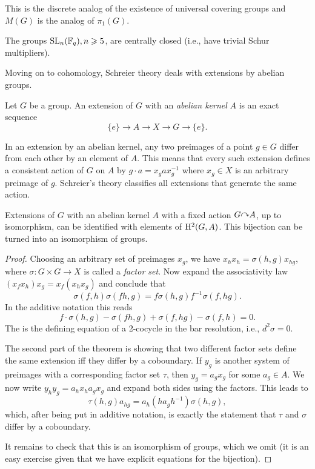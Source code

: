 This is the discrete analog of the existence of universal covering groups and $M(G)$ is the analog of $\pi_1(G)$.

\begin{thm}[Schur]
    The groups $\operatorname{SL}_n(\mathbb{F}_q),n\geqslant 5$, are centrally closed (i.e., have trivial Schur multipliers).
\end{thm}

Moving on to cohomology, Schreier theory deals with extensions by abelian groups.

\begin{defn}
    Let $G$ be a group. An extension of $G$ with an \emph{abelian kernel} $A$ is an exact sequence
    \[\{e\}\to A\to X\to G\to \{e\}.\]
\end{defn}

In an extension by an abelian kernel, any two preimages of a point $g\in G$ differ from each other by an element of $A$. This means that every such extension defines a consistent action of $G$ on $A$ by $g\cdot a=x_g ax_g^{-1}$ where $x_g\in X$ is an arbitrary preimage of $g$. Schreier's theory classifies all extensions that generate the same action.

\begin{thm}[Schreier]
    Extensions of $G$ with an abelian kernel $A$ with a fixed action $G\acts A$, up to isomorphism, can be identified with elements of $\mathrm{H}^2(G,A)$. This bijection can be turned into an isomorphism of groups.
\end{thm}
\begin{proof}
    Choosing an arbitrary set of preimages $x_g$, we have $x_hx_h=\sigma(h,g)x_{hg}$, where $\sigma:G\times G\to X$ is called a \emph{factor set}. Now expand the associativity law $(x_fx_h)x_g=x_f(x_hx_g)$ and conclude that 
    \[\sigma(f,h)\sigma(fh,g)=f\sigma(h,g)f^{-1}\sigma(f,hg).\]
    In the additive notation this reads
    \[f\cdot\sigma(h,g)-\sigma(fh,g)+\sigma(f,hg)-\sigma(f,h)=0.\]
    The is the defining equation of a 2-cocycle in the bar resolution, i.e., $d^2\sigma=0$.

    The second part of the theorem is showing that two different factor sets define the same extension iff they differ by a coboundary. If $y_g$ is another system of preimages with a corresponding factor set $\tau$, then $y_g=a_gx_g$ for some $a_g\in A$. We now write $y_hy_g=a_hx_ha_gx_g$ and expand both sides using the factors. This leads to
    \[\tau(h,g)a_{hg}=a_h (ha_gh^{-1})\sigma(h,g),\]
    which, after being put in additive notation, is exactly the statement that $\tau$ and $\sigma$ differ by a coboundary.

    It remains to check that this is an isomorphism of groups, which we omit (it is an easy exercise given that we have explicit equations for the bijection).
\end{proof}

